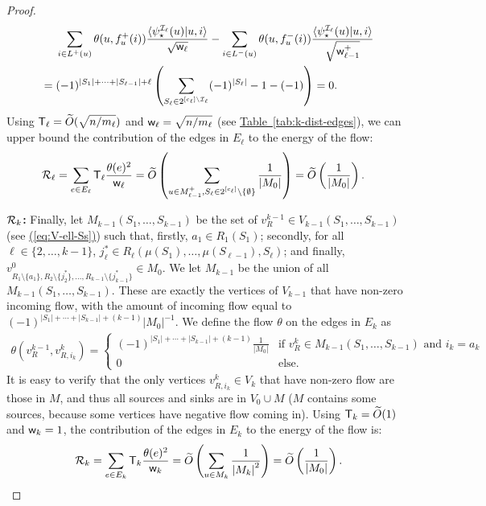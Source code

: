 \documentclass{article}
\newcommand{\eq}[1]{\hyperref[eq:#1]{(\ref*{eq:#1})}}
\newcommand{\tabl}[1]{\hyperref[tab:#1]{Table~\ref*{tab:#1}}}
\renewcommand{\>}{\rangle}
\newcommand{\<}{\langle}
\renewcommand{\(}{\left(}
\renewcommand{\)}{\right)}
\def\braket#1#2{{{\langle}#1\vert}#2\rangle}
\def\abs#1{\left| #1 \right|}
\def\w{{\sf w}}
\begin{document}
\begin{proof}
\begin{align*}
			&\sum_{i\in L^+(u)}\theta(u,f^+_{u}(i))\frac{\braket{\psi_\star^{{\cal I}_{\ell}}(u)}{u,i}}{\sqrt{\w_{\ell}}}-\sum_{i\in L^-(u)}\theta(u,f^- _{u}(i))\frac{\braket{\psi_\star^{{\cal I}_{\ell}}(u)}{u,i}}{\sqrt{\w_{\ell-1}^+}}\\
			={}& (-1)^{|S_1|+\dots+|S_{\ell-1}|+{\ell}}\left(\sum_{S_\ell\in 2^{[c_{\ell}]\setminus{\cal I}_{\ell}}}(-1)^{|S_{\ell}|}-1-(-1)\right)=0.
		\end{align*}
Using ${\sf T}_{\ell}=\widetilde{O}(\sqrt{n/m_{\ell}})$ and $\w_{\ell}=\sqrt{n/m_{\ell}}$ (see \tabl{k-dist-edges}), we can upper bound the contribution of the edges in $E_{\ell}$ to the energy of the flow:
\begin{equation}
\begin{split}
			{\cal R}_{\ell} &= \sum_{e\in E_{\ell}}{\sf T}_{\ell}\frac{\theta(e)^2}{\w_{\ell}} = \widetilde{O}\left(\sum_{\substack{u \in M_{\ell-1}^+, S_{\ell} \in 2^{[c_{\ell}]} \setminus \{\emptyset\}}}\frac{1}{\abs{M_0}}\right)=\widetilde{O}\left(\frac{1}{\abs{M_0}}\right).
\end{split}\label{eq:k-Rell}
\end{equation}
	
\vskip7pt	
\noindent\textbf{${\cal R}_{k}$:} Finally, let $M_{k-1}(S_1,\dots,S_{k-1})$ be the set of $v^{k-1}_{R}\in V_{k-1}(S_1,\dots,S_{k-1})$ (see \eq{V-ell-Ss}) such that, firstly, 
$a_1\in R_1(S_1)$; secondly, for all $\ell\in\{2,\dots,k-1\}$, $j_{\ell}^*\in R_{\ell}(\mu(S_1),\dots,\mu(S_{\ell-1}),S_{\ell})$; and finally,
$v^{0}_{R_1\setminus\{a_1\},R_2\setminus\{j_2^*\},\dots,R_{k-1}\setminus\{j_{k-1}^*\}}\in M_0.$
We let $M_{k-1}$ be the union of all $M_{k-1}(S_1,\dots,S_{k-1})$.
These are exactly the vertices of $V_{k-1}$ that have non-zero incoming flow, with the amount of incoming flow equal to $(-1)^{\abs{S_1} + \cdots +\abs{S_{k-1}}+(k-1)}{\abs{M_0}}^{-1}$. We define the flow $\theta$ on the edges in $E_{k}$ as 
		\begin{align*} 
			\theta(v^{k-1}_{R},v^k_{R,i_{k}})= \begin{cases}
				\left(-1\right)^{\abs{S_1} + \cdots + \abs{S_{k-1}}+\left(k-1\right)}\frac{1}{\abs{M_0}} &\text{if } v^k_R \in M_{k-1}(S_1,\dots,S_{k-1})\text{ and } i_{k} = a_k\\
				0 &\text{else}.
			\end{cases}
		\end{align*}
It is easy to verify that the only vertices $v^k_{R,i_k}\in V_k$ that have non-zero flow are those in $M$, and thus all sources and sinks are in $V_0\cup M$ ($M$ contains some sources, because some vertices have negative flow coming in). Using ${\sf T}_k=\widetilde{O}(1)$ and $\w_k=1$, the contribution of the edges in $E_k$ to the energy of the flow is:
\begin{equation}
			{\cal R}_k = \sum_{e\in E_k}{\sf T}_k\frac{\theta(e)^2}{\w_k} = \widetilde{O}\left(\sum_{u\in M_k}\frac{1}{\abs{M_k}^2}\right)=\widetilde{O}\left(\frac{1}{\abs{M_0}}\right)\label{eq:k-Rk}.
		\end{equation}


\end{proof}
\end{document}
